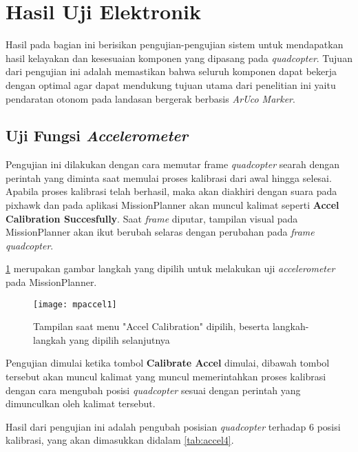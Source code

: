 \section{Hasil Uji Elektronik}
Hasil pada bagian ini berisikan pengujian-pengujian sistem untuk mendapatkan hasil kelayakan dan kesesuaian komponen yang dipasang pada \textit{quadcopter}. Tujuan dari pengujian ini adalah memastikan bahwa seluruh komponen dapat bekerja dengan optimal agar dapat mendukung tujuan utama dari penelitian ini yaitu pendaratan otonom pada landasan bergerak berbasis \textit{ArUco Marker}.

\subsection{Uji Fungsi \textit{Accelerometer}}
Pengujian ini dilakukan dengan cara memutar frame \textit{quadcopter} searah dengan perintah yang diminta saat memulai proses kalibrasi dari awal hingga selesai. Apabila proses kalibrasi telah berhasil, maka akan diakhiri dengan suara pada pixhawk dan pada aplikasi MissionPlanner akan muncul kalimat seperti \textbf{Accel Calibration Succesfully}. Saat \textit{frame} diputar, tampilan visual pada MissionPlanner akan ikut berubah selaras dengan perubahan pada \textit{frame} \textit{quadcopter}. 

\cref{fig:mpaccel1} merupakan gambar langkah yang dipilih untuk melakukan uji \textit{accelerometer} pada MissionPlanner.

\begin{figure}[H]
	\centering
	\texttt{[image: mpaccel1]}
	\caption{Tampilan saat menu "Accel Calibration" dipilih, beserta langkah-langkah yang dipilih selanjutnya}
	\label{fig:mpaccel1}
\end{figure}

Pengujian dimulai ketika tombol \textbf{Calibrate Accel} dimulai, dibawah tombol tersebut akan muncul kalimat yang muncul memerintahkan proses kalibrasi dengan cara mengubah posisi \textit{quadcopter} sesuai dengan perintah yang dimunculkan oleh kalimat tersebut. 

Hasil dari pengujian ini adalah pengubah posisian \textit{quadcopter} terhadap 6 posisi kalibrasi, yang akan dimasukkan didalam \cref{tab:accel4}.

